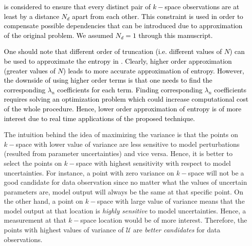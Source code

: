 \documentclass{article}         %
\theoremstyle{definition}
\theoremstyle{remark}
\begin{document}
\textcolor{black}{ is considered to ensure that every distinct
pair of $k-$space observations are at least by a distance $N_d$ apart from each
other. This constraint is used in order to compensate possible dependencies
that can be introduced due to approximation of the original problem. We assumed
$N_d=1$ through this manuscript.}

\textcolor{black}{One should note that different order of truncation (i.e.
different values of $N$) can be used to approximate the entropy in
. Clearly, higher order approximation (greater values of
$N$) leads to more accurate approximation of entropy. However, the downside of
using higher order terms is that one needs to find the corresponding
$\lambda_n$ coefficients for each term. Finding corresponding $\lambda_n$
coefficients requires solving an optimization problem which could increase
computational cost of the whole procedure. Hence, lower order approximation of
entropy is of more interest due to real time applications of the proposed
technique.}

%
The intuition behind the idea of maximizing the variance is that the points on
$k-$space with lower value of variance are less sensitive to model
perturbations (resulted from parameter uncertainties) and vice versa. Hence, it
is better to select the points on $k-$space with highest sensitivity with
respect to model uncertainties. For instance, a point with zero variance on
$k-$space will not be a good candidate for data observation since no matter
what the values of uncertain parameters are, model output will always be the
same at that specific point. On the other hand, a point on $k-$space with large
value of variance means that the model output at that location is
\textit{highly sensitive} to model uncertainties. Hence, a measurement at that
$k-$space location would be of more interest. Therefore, the points with
highest values of variance of $\mathcal{U}$ are \textit{better candidates} for
data observations. 
\end{document}
